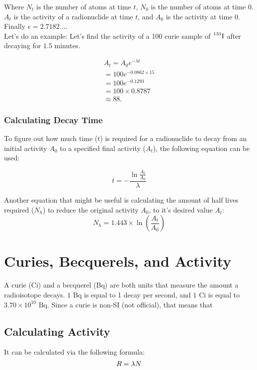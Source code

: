 \documentclass{article}
\begin{document}
\begin{multicols*}{2}
    Where $N_t$ is the number of atoms at time $t$, $N_0$ is the number
    of atoms at time $0$. $A_t$ is the activity of a radionuclide at time $t$,
    and $A_0$ is the activity at time $0$. Finally $e = 2.7182\ldots$.\\

    Let's do an example: Let's find the activity of a 100 curie sample of
    $\ce{^{131}I}$ after decaying for $1.5$ minutes.

    \begin{equation*}
      \begin{split}
        A_t = A_{0}e^{-\lambda{t}} \\
        = 100e^{-0.0862 \times 15} \\
        = 100e^{-0.1293} \\
        = 100 \times 0.8787 \\
        \approx 88.
      \end{split}
    \end{equation*}

    \subsubsection{Calculating Decay Time}
    To figure out how much time ($t$) is required for a radionuclide to decay
    from an initial activity $A_0$ to a specified final activity ($A_t$), the
    following equation can be used:

    \[
      t = -\frac{\ln{\frac{A_t}{A_0}}}{\lambda}
    \]

    Another equation that might be useful is calculating the amount of half lives
    required ($N_h$) to reduce the original activity $A_0$, to it's desired value $A_t$:
    \[
      N_h = 1.443 \times \ln{\left( \frac{A_t}{A_0} \right)}
    \]

    \section{Curies, Becquerels, and Activity}
    A curie (Ci) and a becquerel (Bq) are both units that measure the amount a radioisotope
    decays. $1 \text{ Bq}$ is equal to 1 decay per second, and $1 \text{ Ci}$ is equal to
    $3.70 \times 10^{10} \text{ Bq}$. Since a curie is non-SI (not official), that means that


    \subsection{Calculating Activity}
    It can be calculated via the following formula:
    \[
      R = \lambda{N}\\
    \]


\end{multicols*}
\end{document}
